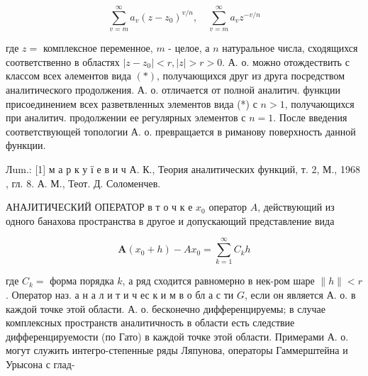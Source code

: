 \documentclass[10pt]{article}
\begin{document}
\[

\sum_{v=m}^{\infty} a_{v}\left(z-z_{0}\right)^{v / n}, \quad \sum_{v=m}^{\infty} a_{v} z^{-v / n}

\]



где $z=$ комплексное переменное, $m$ - целое, а $n$ натуральное числа, сходящихся соответственно в областях $\left|z-z_{0}\right|<r,|z|>r>0$. А. о. можно отождествить с классом всех әлементов вида $(*)$, получающихся друг из друга посредством аналитического продолжения. А. о. отличается от полной аналитич. функции присоединением всех разветвленных элементов вида (*) с $n>1$, получающихся при аналитич. продолжении ее регулярных элементов с $n=1$. После введения соответствующей топологии А. о. превращается в риманову поверхность данной функции.



Лum.: [1] м а р к у ї е в и ч А. К., Теория аналитических функций, т. 2, М., 1968 , гл. 8. А. М., Теот. Д. Соломенчев.



АНАЈИТИЧЕСКИЙ ОПЕРАТОР в т о ч к е $x_{0}$ оператор $A$, действующий из одного банахова пространства в другое и допускающий представление вида



\[

\boldsymbol{A}\left(x_{0}+h\right)-A x_{0}=\sum_{k=1}^{\infty} C_{k} h

\]



где $C_{k}=$ форма порядка $k$, а ряд сходится равномерно в нек-ром шаре $\|h\|<r$. Оператор наз. а н а л и т и ч ес к и м в о бл а с ти $G$, если он является А. о. в каждой точке этой области. А. о. бесконечно дифференцируемы; в случае комплексных пространств аналитичность в области есть следствие дифференцируемости (по Гато) в каждой точке этой области. Примерами А. о. могут служить интегро-степенные ряды Ляпунова, операторы Гаммерштейна и Урысона с глад-
\end{document}
